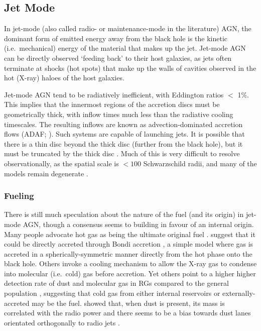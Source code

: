 	\subsection{Jet Mode}
		\label{subsec:Jet}
		In jet-mode (also called radio- or maintenance-mode in the literature) AGN, the dominant form of emitted energy away from the black hole is the kinetic (i.e.\ mechanical) energy of the material that makes up the jet. Jet-mode AGN can be directly observed `feeding back' to their host galaxies, as jets often terminate at shocks (hot spots) that make up the walls of cavities observed in the hot (X-ray) haloes of the host galaxies.

		Jet-mode AGN tend to be radiatively inefficient, with Eddington ratios $<$ 1\%. This implies that the innermost regions of the accretion discs must be geometrically thick, with inflow times much less than the radiative cooling timescales. The resulting inflows are known as advection-dominated accretion flows (ADAF; \citealt{Narayan1994}). Such systems are capable of launching jets. It is possible that there is a thin disc beyond the thick disc (further from the black hole), but it must be truncated by the thick disc \cite[e.g.][]{Abramowicz2002, Sadler2014}. Much of this is very difficult to resolve observationally, as the spatial scale is $< 100$ Schwarzschild radii, and many of the models remain degenerate \citep[e.g.][]{Quataert1999}. 

		\subsubsection{Fueling}
			\label{subsubsec:JetFueling}
			There is still much speculation about the nature of the fuel (and its origin) in jet-mode AGN, though a consensus seems to building in favour of an internal origin. Many people advocate hot gas as being the ultimate original fuel \citep[e.g.][]{Allen2006}. \citet{Hardcastle2007} suggest that it could be directly accreted through Bondi accretion \citep{Bondi1952}, a simple model where gas is accreted in a spherically-symmetric manner directly from the hot phase onto the black hole. Others invoke a cooling mechanism to allow the X-ray gas to condense into molecular (i.e.\ cold) gas before accretion. Yet others point to a higher higher detection rate of dust and molecular gas in RGs compared to the general population \citep[e.g.][]{Lim2000, DeRuiter2002, Leon2003, VerdoesKleijn2005}, suggesting that cold gas from either internal reservoirs or externally-accreted may be the fuel. \citet{DeRuiter2002} showed that, when dust is present, its mass is correlated with the radio power and there seems to be a bias towards dust lanes orientated orthogonally to radio jets \citep{VerdoesKleijn2005}.

